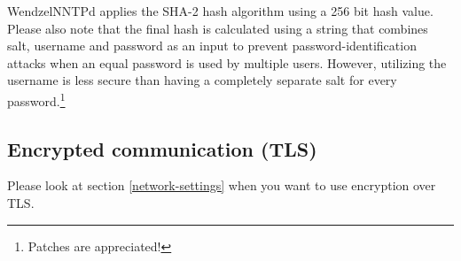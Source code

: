 WendzelNNTPd applies the SHA-2 hash algorithm using a 256 bit hash value. Please also note that the final hash is calculated using a string that combines salt, username and password as an input to prevent password-identification attacks when an equal password is used by multiple users. However, utilizing the username is less secure than having a completely separate salt for every password.\footnote{Patches are appreciated!}

\subsection{Encrypted communication (TLS)}
Please look at section \ref{network-settings} when you want to use encryption over TLS.


